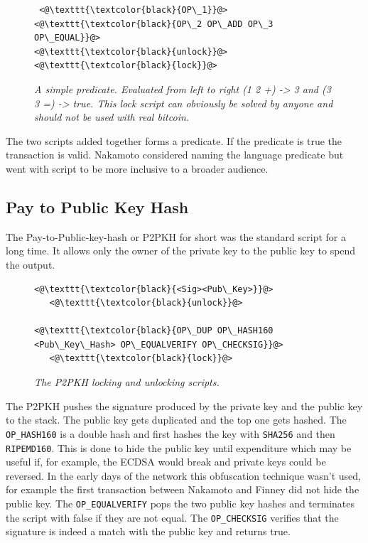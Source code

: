 \begin{figure}[!hbt]
		\centering
	\begin{lstlisting}
 <@\texttt{\textcolor{black}{OP\_1}}@>   <@\texttt{\textcolor{black}{OP\_2 OP\_ADD OP\_3 OP\_EQUAL}}@>
<@\texttt{\textcolor{black}{unlock}}@>           <@\texttt{\textcolor{black}{lock}}@>
	\end{lstlisting}
	
	\caption{\textit{ A simple predicate. Evaluated from left to right (1 2 +) -> 3 and
			(3 3 =) -> true. This lock script can obviously be solved by anyone and should not be used with real bitcoin.
	}}
	\label{fig:simple:script}
\end{figure}

The two scripts added together forms a predicate. If the predicate is true the transaction is valid. Nakamoto considered naming the language predicate but went with script to be more inclusive to a broader audience\cite{nakamoto:predicate}.

\subsection{Pay to Public Key Hash}

The Pay-to-Public-key-hash or P2PKH for short was the standard script for a long time. It allows only the owner of 
the private key to the public key to spend the output.

\begin{figure}[!hbt]
		\centering
	\begin{lstlisting}
<@\texttt{\textcolor{black}{<Sig><Pub\_Key>}}@>   
   <@\texttt{\textcolor{black}{unlock}}@>
   
<@\texttt{\textcolor{black}{OP\_DUP OP\_HASH160 <Pub\_Key\_Hash> OP\_EQUALVERIFY OP\_CHECKSIG}}@>
   <@\texttt{\textcolor{black}{lock}}@>
	\end{lstlisting}
	
	\caption{\textit{ The P2PKH locking and unlocking scripts.
	}}
	\label{fig:P2PKH}
\end{figure}

The P2PKH pushes the signature produced by the private key and the public key to the stack. The public key gets duplicated and the top one gets hashed. The \texttt{OP\_HASH160} is a double hash and first hashes the key with \texttt{SHA256} and then \texttt{RIPEMD160}. This is done to hide the public key until expenditure which may be useful if, for example, the ECDSA would break and private keys could be reversed. In the early days of the network this obfuscation technique wasn't used, for example the first transaction between Nakamoto and Finney did not hide the public key\cite{nakamoto:finney:tx}. The \texttt{OP\_EQUALVERIFY} pops the two public key hashes and terminates the script with false if they are not equal. The \texttt{OP\_CHECKSIG} verifies that the signature is indeed a match with the public key and returns true. 

